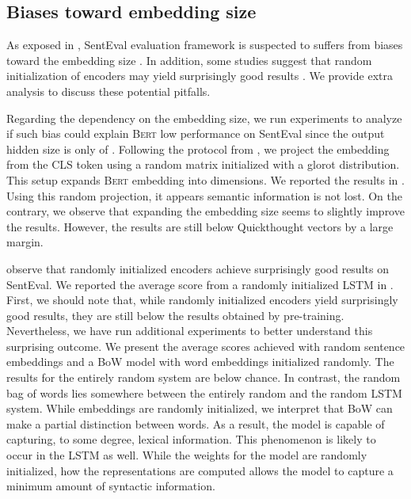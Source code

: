 
\subsection{Biases toward embedding size}

As exposed in , SentEval evaluation framework is suspected to suffers from biases toward the embedding size \parencite{eger_19}. In addition, some studies suggest that random initialization of encoders may yield surprisingly good results \parencite{wieting_19}. We provide extra analysis to discuss these potential pitfalls.

Regarding the dependency on the embedding size, we run experiments to analyze if such bias could explain \textsc{Bert} low performance on SentEval since the output hidden size is only of  . Following the protocol from \textcite{wieting_19}, we project the embedding from the \textsc{CLS} token using a random matrix initialized with a glorot distribution. This setup expands \textsc{Bert} embedding into  dimensions. We reported the results in . Using this random projection, it appears semantic information is not lost. 
On the contrary, we observe that expanding the embedding size seems to slightly improve the results.  However, the results are still below Quickthought vectors by a large margin.

\textcite{wieting_19} observe that randomly initialized encoders achieve surprisingly good results on SentEval. We reported the average score from a randomly initialized LSTM in . First, we should note that, while randomly initialized encoders yield surprisingly good results, they are still below the results obtained by pre-training. Nevertheless, we have run additional experiments to better understand this surprising outcome. We present the average scores achieved with random sentence embeddings and a BoW model with word embeddings initialized randomly. The results for the entirely random system are below chance.
In contrast, the random bag of words lies somewhere between the entirely random and the random LSTM system. While embeddings are randomly initialized, we interpret that BoW can make a partial distinction between words. As a result, the model is capable of capturing, to some degree, lexical information. This phenomenon is likely to occur in the LSTM as well. While the weights for the model are randomly initialized, how the representations are computed allows the model to capture a minimum amount of syntactic information.

